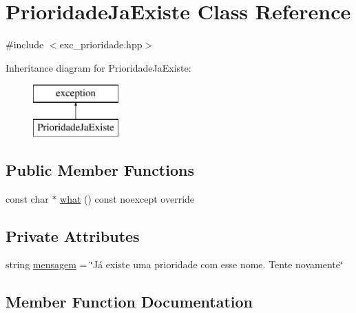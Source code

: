 \hypertarget{classPrioridadeJaExiste}{}\section{Prioridade\+Ja\+Existe Class Reference}
\label{classPrioridadeJaExiste}


{\ttfamily \#include $<$exc\+\_\+prioridade.\+hpp$>$}

Inheritance diagram for Prioridade\+Ja\+Existe\+:\begin{figure}[H]
\begin{center}
\leavevmode
\includegraphics[height=2.000000cm]{classPrioridadeJaExiste}
\end{center}
\end{figure}
\subsection*{Public Member Functions}
\begin{DoxyCompactItemize}
\item 
const char $\ast$ \hyperlink{classPrioridadeJaExiste_aa2859fd1148802c4145ee579e04c1e7e}{what} () const noexcept override
\end{DoxyCompactItemize}
\subsection*{Private Attributes}
\begin{DoxyCompactItemize}
\item 
string \hyperlink{classPrioridadeJaExiste_aceee66510e48bda05955378f9e481104}{mensagem} = \char`\"{}Já existe uma prioridade com esse nome. Tente novamente\char`\"{}
\end{DoxyCompactItemize}


\subsection{Member Function Documentation}
\mbox{\label{classPrioridadeJaExiste_aa2859fd1148802c4145ee579e04c1e7e}} 

